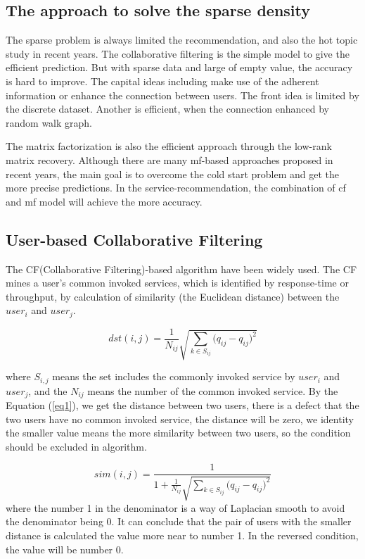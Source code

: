 \documentclass[conference]{IEEEtran}
\begin{document}
\subsection{The approach to solve the sparse density}
\par The sparse problem is always limited the recommendation, and also the hot topic study in recent years. The collaborative filtering is the simple model to give the efficient prediction. But with sparse data and large of empty value, the accuracy is hard to improve. The capital ideas including make use of the adherent information or enhance the connection between users. The front idea is limited by the discrete dataset. Another is efficient, when the connection enhanced by random walk graph. 
\par The matrix factorization is also the efficient approach through the low-rank matrix recovery. Although there are many mf-based approaches proposed in recent years, the main goal is to overcome the cold start problem and get the more precise predictions. In the service-recommendation, the combination of cf and mf model will achieve the more accuracy.      

\subsection{User-based Collaborative Filtering}
The CF(Collaborative Filtering)-based algorithm have been widely used. The CF mines a user's common invoked services, which is identified by response-time or throughput, by calculation of similarity (the Euclidean distance) between the $user_i$ and $user_j$.

\begin{equation}
dst(i,j)=\frac{1}{
  N_{ij}}\sqrt{\sum_{k \in S_{ij}}{(q_{ij}-q_{ij}})^{2}
} \label{eq1}
\end{equation}

where $S_{i,j}$ means the set includes the commonly invoked service by $user_{i}$ and $user_{j}$, and the $N_{ij}$ means the number of the common invoked service. By the Equation (\ref{eq1}), we get the distance between two users, there is a defect that the two users have no common invoked service, the distance will be zero, we identity the smaller value  means the more similarity between two users, so the condition should be excluded in algorithm. 

\begin{equation}
sim(i,j)=\frac{1}{
  1+\frac{1}{N_{ij}}\sqrt{\sum_{k \in S_{ij}}{(q_{ij}-q_{ij}})^{2}}
}  \label{eq2}
\end{equation}
where the number 1 in the denominator is a way of Laplacian smooth to avoid the denominator being 0. It can conclude that the pair of users with the smaller distance is calculated the value more near to number 1. In the reversed condition, the value will be number 0.
\end{document}
